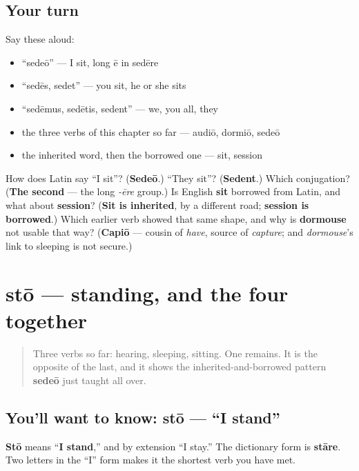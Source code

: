 \subsection*{Your turn}
Say these aloud:

\begin{itemize}
\raggedright
  \item \textquotedblleft{}sedeō\textquotedblright{} — I sit, long ē in sedēre
  \item \textquotedblleft{}sedēs, sedet\textquotedblright{} — you sit, he or she sits
  \item \textquotedblleft{}sedēmus, sedētis, sedent\textquotedblright{} — we, you all, they
  \item the three verbs of this chapter so far — audiō, dormiō, sedeō
  \item the inherited word, then the borrowed one — sit, session
\end{itemize}

\begin{tcolorbox}[breakable,colback=teal!4,colframe=teal!35!black,title={Before you move on}]
How does Latin say \textquotedblleft{}I sit\textquotedblright{}? (\textbf{Sedeō}.) \textquotedblleft{}They sit\textquotedblright{}? (\textbf{Sedent}.) Which conjugation? (\textbf{The second} — the long \emph{-ēre} group.) Is English \textbf{sit} borrowed from Latin, and what about \textbf{session}? (\textbf{Sit is inherited}, by a different road; \textbf{session is borrowed}.) Which earlier verb showed that same shape, and why is \textbf{dormouse} not usable that way? (\textbf{Capiō} — cousin of \emph{have}, source of \emph{capture}; and \emph{dormouse}'s link to sleeping is not secure.)
\end{tcolorbox}
\section[stō, stāre]{stō — standing, and the four together}

\label{lesson:LA-C40-sto}



\begin{quote}
Three verbs so far: hearing, sleeping, sitting. One remains. It is the opposite of the last, and it shows the inherited-and-borrowed pattern \textbf{sedeō} just taught all over.
\end{quote}

\subsection*{You'll want to know: stō — \textquotedblleft{}I stand\textquotedblright{}}
\textbf{Stō} means \textquotedblleft{}\textbf{I stand},\textquotedblright{} and by extension \textquotedblleft{}I stay.\textquotedblright{} The dictionary form is \textbf{stāre}. Two letters in the \textquotedblleft{}I\textquotedblright{} form makes it the shortest verb you have met.

